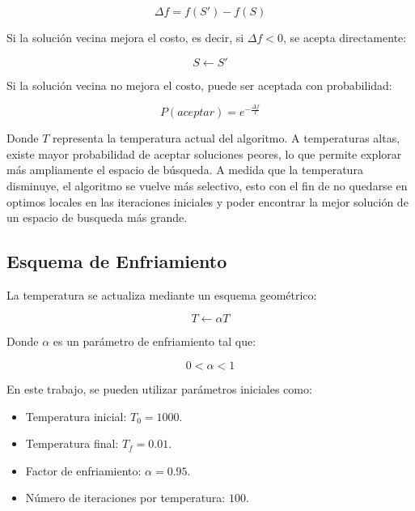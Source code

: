 \begin{equation}
\Delta f = f(S') - f(S)
\end{equation}

Si la solución vecina mejora el costo, es decir, si $\Delta f < 0$, se acepta directamente:

\begin{equation*}
S \leftarrow S'
\end{equation*}

Si la solución vecina no mejora el costo, puede ser aceptada con probabilidad:

\begin{equation}
P(aceptar) = e^{-\frac{\Delta f}{T}}
\end{equation}

Donde $T$ representa la temperatura actual del algoritmo. A temperaturas altas, existe mayor probabilidad de aceptar soluciones peores, lo que permite explorar más ampliamente el espacio de búsqueda. A medida que la temperatura disminuye, el algoritmo se vuelve más selectivo, esto con el fin de no quedarse en optimos locales en las iteraciones iniciales y poder encontrar la mejor solución de un espacio de busqueda más grande.

\subsection{Esquema de Enfriamiento}

La temperatura se actualiza mediante un esquema geométrico:

\begin{equation}
T \leftarrow \alpha T
\end{equation}

Donde $\alpha$ es un parámetro de enfriamiento tal que:

\begin{equation*}
0 < \alpha < 1
\end{equation*}

En este trabajo, se pueden utilizar parámetros iniciales como:

\begin{itemize}
    \item Temperatura inicial: $T_0 = 1000$.
    \item Temperatura final: $T_f = 0.01$.
    \item Factor de enfriamiento: $\alpha = 0.95$.
    \item Número de iteraciones por temperatura: $100$.
\end{itemize}

